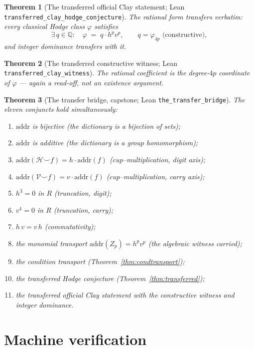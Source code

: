 \documentclass[11pt,a4paper]{article}
\theoremstyle{plain}
\newtheorem{theorem}{Theorem}[section]
\theoremstyle{definition}
\newcommand{\Q}{\mathbb{Q}}
\newcommand{\HC}{\mathcal{H}}
\newcommand{\VV}{\mathcal{V}}
\newcommand{\cycleClass}[1]{Z_{#1}}
\newcommand{\cupop}{\smile}
\begin{document}
\begin{theorem}[The transferred official Clay statement; Lean
\texttt{transferred\_clay\_hodge\_conjecture}]
The rational form transfers verbatim: every classical Hodge class
$\varphi$ satisfies
\[
  \exists\, q \in \Q:\quad \varphi \;=\; q \cdot h^{p}v^{p},
  \qquad q = \varphi_{4p} \text{ (constructive)},
\]
and integer dominance transfers with it.
\end{theorem}

\begin{theorem}[The transferred constructive witness; Lean
\texttt{transferred\_clay\_witness}]
The rational coefficient is the degree-$4p$ coordinate of $\varphi$ ---
again a read-off, not an existence argument.
\end{theorem}

\begin{theorem}[The transfer bridge, capstone; Lean
\texttt{the\_transfer\_bridge}]\label{thm:bridgecapstone}
The eleven conjuncts hold simultaneously:
\begin{enumerate}
\item $\mathrm{addr}$ is bijective (the dictionary is a bijection of sets);
\item $\mathrm{addr}$ is additive (the dictionary is a group homomorphism);
\item $\mathrm{addr}(\HC \cupop f) = h\cdot\mathrm{addr}(f)$
  (cup--multiplication, digit axis);
\item $\mathrm{addr}(\VV \cupop f) = v\cdot\mathrm{addr}(f)$
  (cup--multiplication, carry axis);
\item $h^{3} = 0$ in $R$ (truncation, digit);
\item $v^{4} = 0$ in $R$ (truncation, carry);
\item $h\,v = v\,h$ (commutativity);
\item the monomial transport $\mathrm{addr}(\cycleClass{p}) = h^{p}v^{p}$
  (the algebraic witness carried);
\item the condition transport (Theorem~\ref{thm:condtransport});
\item the transferred Hodge conjecture
  (Theorem~\ref{thm:transferred});
\item the transferred official Clay statement with the constructive witness
  and integer dominance.
\end{enumerate}
\end{theorem}

\section{Machine verification}\label{sec:machine}
\end{document}
